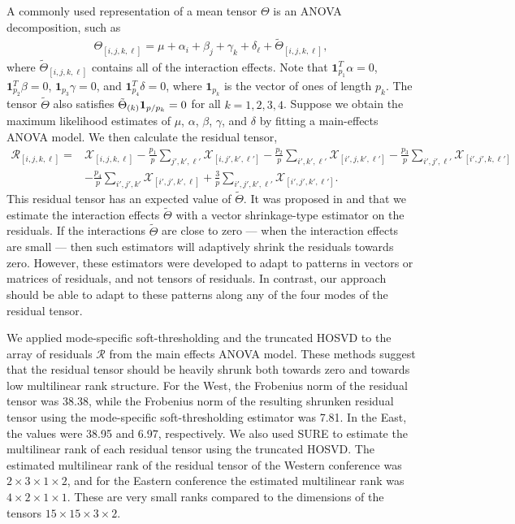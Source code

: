 A commonly used representation of a mean tensor $\Theta$ is an ANOVA decomposition, such as
\begin{align*}
\Theta_{[i,j,k,\ell]} = \mu + \alpha_i + \beta_j + \gamma_k + \delta_{\ell} + \tilde{\Theta}_{[i,j,k,\ell]},
\end{align*}
where $\tilde{\Theta}_{[i,j,k,\ell]}$ contains all of the interaction
effects. Note that $\mathbf{1}_{p_1}^T\alpha = 0$,
$\mathbf{1}_{p_2}^T\beta = 0$, $\mathbf{1}_{p_3}\gamma = 0$, and
$\mathbf{1}_{p_4}^T\delta = 0$, where $\mathbf{1}_{p_k}$ is the vector
of ones of length $p_k$. The tensor $\tilde{\Theta}$ also satisfies
$\Tilde{\Theta}_{(k)}\mathbf{1}_{p/p_k} = 0$ for all $k = 1,2,3,4$. Suppose we obtain the maximum likelihood estimates of $\mu$,
$\alpha$, $\beta$, $\gamma$, and $\delta$ by fitting a main-effects
ANOVA model. We then calculate the residual tensor,
\begin{align*}
\mathcal{R}_{[i,j,k,\ell]} =& \mathcal{X}_{[i,j,k,\ell]} -
\frac{p_1}{p}\sum_{j',k',\ell'}\mathcal{X}_{[i,j',k',\ell']} -
\frac{p_2}{p}\sum_{i',k',\ell'}\mathcal{X}_{[i',j,k',\ell']} -
\frac{p_3}{p}\sum_{i',j',\ell'}\mathcal{X}_{[i',j',k,\ell']} \\
&- \frac{p_4}{p}\sum_{i',j',k'}\mathcal{X}_{[i',j',k',\ell]} + \frac{3}{p}\sum_{i',j',k',\ell'}\mathcal{X}_{[i',j',k',\ell']}.
\end{align*}
 This residual tensor has an expected value of $\tilde{\Theta}$.
 It was proposed in \cite{stein1966approach} and
\cite{efron1972empirical} that we estimate the interaction effects $\tilde{\Theta}$ with
a vector shrinkage-type estimator on the residuals. If the interactions $\tilde{\Theta}$ are close to zero --- when
the interaction effects are small --- then such estimators will adaptively shrink the residuals towards zero. However, these estimators were developed to adapt to patterns in vectors or matrices of residuals, and not tensors of residuals. In contrast, our approach should be able to adapt to these patterns along any of the four modes of the residual tensor.

We applied mode-specific soft-thresholding and the truncated HOSVD to the array of residuals $\mathcal{R}$ from the main effects ANOVA model. These methods suggest that the residual tensor should be heavily shrunk both towards zero and towards low multilinear rank structure. For the West, the Frobenius norm of the residual tensor was 38.38, while the Frobenius norm of the resulting shrunken residual tensor using the mode-specific soft-thresholding estimator was 7.81. In the East, the values were 38.95 and 6.97, respectively. We also used SURE to estimate the multilinear rank of each residual tensor using the truncated HOSVD. The estimated multilinear rank of the residual tensor of the Western conference was  $2 \times 3 \times 1 \times 2$, and for the Eastern conference the estimated multilinear rank was $4 \times 2 \times 1 \times 1$. These are very small ranks compared to the dimensions of the tensors $15 \times 15 \times 3 \times 2$.

